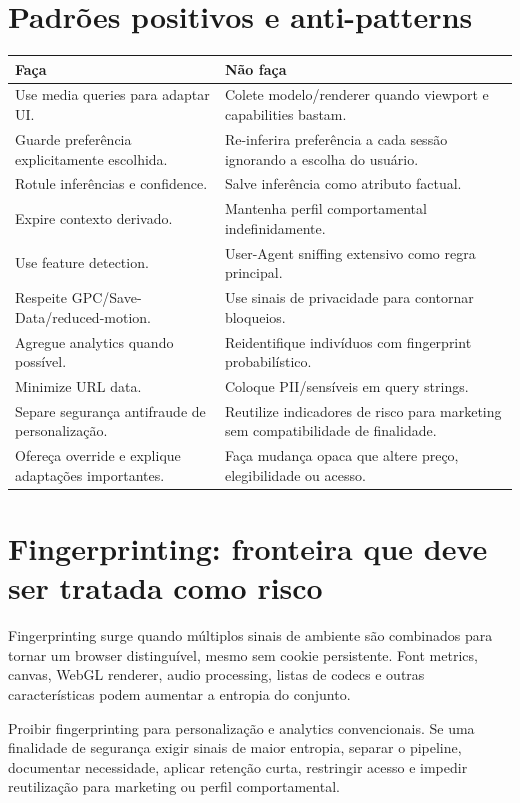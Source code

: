 \documentclass[11pt,a4paper]{article}
\begin{document}
\section{Padrões positivos e anti-patterns}
\begin{longtable}{p{7cm}p{7cm}}
\toprule
\textbf{Faça} & \textbf{Não faça}\\\midrule\endhead
Use media queries para adaptar UI. & Colete modelo/renderer quando viewport e capabilities bastam.\\
Guarde preferência explicitamente escolhida. & Re-inferira preferência a cada sessão ignorando a escolha do usuário.\\
Rotule inferências e confidence. & Salve inferência como atributo factual.\\
Expire contexto derivado. & Mantenha perfil comportamental indefinidamente.\\
Use feature detection. & User-Agent sniffing extensivo como regra principal.\\
Respeite GPC/Save-Data/reduced-motion. & Use sinais de privacidade para contornar bloqueios.\\
Agregue analytics quando possível. & Reidentifique indivíduos com fingerprint probabilístico.\\
Minimize URL data. & Coloque PII/sensíveis em query strings.\\
Separe segurança antifraude de personalização. & Reutilize indicadores de risco para marketing sem compatibilidade de finalidade.\\
Ofereça override e explique adaptações importantes. & Faça mudança opaca que altere preço, elegibilidade ou acesso.\\
\bottomrule
\end{longtable}

\section{Fingerprinting: fronteira que deve ser tratada como risco}
Fingerprinting surge quando múltiplos sinais de ambiente são combinados para tornar um browser distinguível, mesmo sem cookie persistente. Font metrics, canvas, WebGL renderer, audio processing, listas de codecs e outras características podem aumentar a entropia do conjunto.

\begin{riskBox}
Proibir fingerprinting para personalização e analytics convencionais. Se uma finalidade de segurança exigir sinais de maior entropia, separar o pipeline, documentar necessidade, aplicar retenção curta, restringir acesso e impedir reutilização para marketing ou perfil comportamental.
\end{riskBox}
\end{document}

